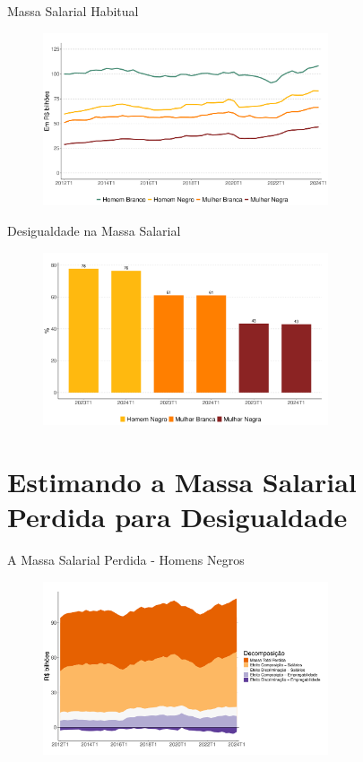 \documentclass[10pt, xcolor=x11names,compress]{beamer}
\begin{document}
	\begin{frame}{Massa Salarial Habitual}
		\begin{figure}
			\centering
			\includegraphics[width = 0.75\textwidth]{figures_output/massa_habitual_gen_raca.pdf}
		\end{figure}
	\end{frame}
	
	\begin{frame}{Desigualdade na Massa Salarial}
		\begin{figure}
			\centering
			\includegraphics[width = 0.75\textwidth]{figures_output/frac_massa_habitual.pdf}
		\end{figure}
	\end{frame}		
	
	\section{Estimando a Massa Salarial Perdida para Desigualdade}
	\begin{frame}{A Massa Salarial Perdida - Homens Negros}
	\begin{figure}
		\centering
			\includegraphics[width = 0.75\textwidth]{figures_output/homem_negro_massa_perdida_gph.pdf}
	\end{figure}
	\end{frame}	
	
\end{document}
